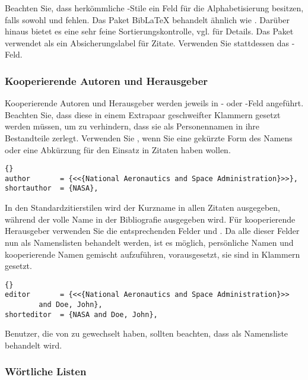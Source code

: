 \documentclass{ltxdockit}[2011/03/25]
\newcommand*{\biblatex}{BibLaTeX\xspace}
\begin{document}
Beachten Sie, dass herkömmliche \bibtex-Stile ein Feld  für die
Alphabetisierung besitzen, falls sowohl  und 
fehlen. Das Paket \biblatex behandelt  ähnlich wie
. Darüber hinaus bietet es eine sehr feine
Sortierungskontrolle, vgl.  für Details. Das Paket
 verwendet  als ein Absicherungslabel für Zitate.
Verwenden Sie stattdessen das -Feld.

\subsubsection{Kooperierende Autoren und Herausgeber} \label{bib:use:inc}

Kooperierende Autoren und Herausgeber werden jeweils in - oder
-Feld angeführt. Beachten Sie, dass diese in einem Extrapaar
geschweifter Klammern gesetzt werden müssen, um zu verhindern, dass sie \bibtex
als Personennamen in ihre Bestandteile zerlegt. Verwenden Sie
, wenn Sie eine gekürzte Form  des Namens oder eine
Abkürzung für den Einsatz in Zitaten haben wollen.

\begin{lstlisting}[style=bibtex]{}
author       = {<<{National Aeronautics and Space Administration}>>}, 
shortauthor  = {NASA}, 
\end{lstlisting}
%
In den Standardzitierstilen wird der Kurzname in allen Zitaten ausgegeben,
während der volle Name in der Bibliografie ausgegeben wird. Für kooperierende
Herausgeber verwenden Sie die entsprechenden Felder  und
. Da alle dieser Felder nun als Namenslisten behandelt werden,
ist es möglich, persönliche Namen und kooperierende Namen gemischt aufzuführen,
vorausgesetzt, sie sind in Klammern gesetzt.

\begin{lstlisting}[style=bibtex]{} 
editor       = {<<{National Aeronautics and Space Administration}>>
		and Doe, John}, 
shorteditor  = {NASA and Doe, John},
\end{lstlisting}
%
Benutzer, die von  zu  gewechselt haben, sollten
beachten, dass  als Namensliste behandelt wird.

\subsubsection{Wörtliche Listen} \label{bib:use:and}
\end{document}
